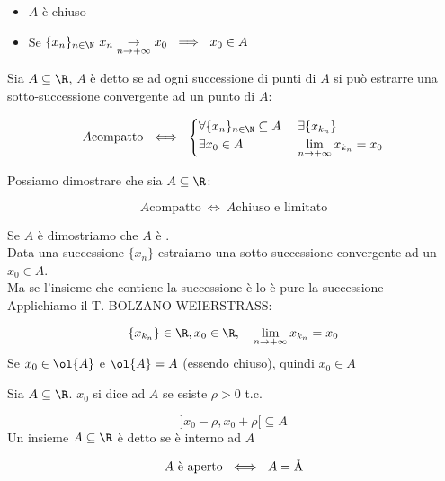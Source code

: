 \documentclass[../analisi.tex]{subfiles}
\begin{document}
\begin{itemize}
	\item $A$ è chiuso
	\item Se $\{ x_n \}_{n \in \N}\ x_n 
	      \underset{\nti}{\to} x_0\ \implies\ x_0 \in A$
\end{itemize}


\begin{defn}
Sia $\acr$, $A$ è detto  se ad ogni successione di punti di $A$ si
può estrarre una sotto-successione convergente ad un punto di $A$:


\begin{equation}
	A \mbox{compatto}\ \iff\ 
	\begin{cases}
	\forall \{ x_n \}_{n \in \N} \subseteq A\ & \exists \{ x_{k_n} \}\\
	\exists x_0 \in A	 		  & \limm x_{k_n} = x_0
	\end{cases}
\end{equation}
\end{defn}
Possiamo dimostrare che sia $ \acr $:


\begin{equation}
	A \mbox{compatto}\ \iff\ A \mbox{chiuso e limitato}
\end{equation}


\begin{dimo}
Se $A$ è  dimostriamo che $A$ è .\\
Data una successione $ \{ x_n \} $ estraiamo una sotto-successione convergente
ad un $x_0 \in A$.\\
Ma se l'insieme che contiene la successione è 
 lo è pure la successione\\ 
Applichiamo il T. BOLZANO-WEIERSTRASS:


\begin{equation}
	\{x_{k_n}\} \in \R, x_0 \in \R,\quad \limm x_{k_n} = x_0
\end{equation}
Se $x_0 \in \ol{A}$ e $\ol{A} = A$ (essendo chiuso), quindi $ x_0 \in A $
\end{dimo}


\begin{defn}
Sia $\acr$. $x_0$ si dice  ad $A$ se esiste $\rho > 0$ t.c. 


\begin{equation}
] x_0 - \rho, x_0 + \rho [ \subseteq A
\end{equation}
Un insieme $ \acr$ è detto  se  è interno ad $A$


\begin{equation}
	A\ \mbox{è aperto}\ \iff\ A = \mbox{\r{A}}
\end{equation}
\end{defn}
\end{document}
